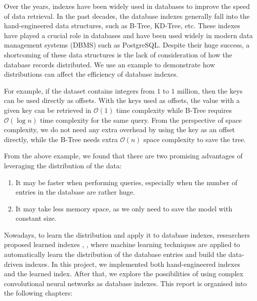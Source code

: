 Over the years, indexes have been widely used in databases to improve the speed of data retrieval. In the past decades, the database indexes generally fall into the hand-engineered data structures, such as B-Tree, KD-Tree, etc. These indexes have played a crucial role in databases and have been used widely in modern data management systems (DBMS) such as PostgreSQL. Despite their huge success, a shortcoming of these data structures is the lack of consideration of how the database records distributed. We use an example to demonstrate how distributions can affect the efficiency of database indexes.

\begin{mscexample}
	For example, if the dataset contains integers from $1$ to $1$ million, then the keys can be used directly as offsets. With the keys used as offsets, the value with a given key can be retrieved in $\mathcal{O}(1)$ time complexity while B-Tree requires $\mathcal{O}(\log n)$ time complexity for the same query. From the perspective of space complexity, we do not need any extra overhead by using the key as an offset directly, while the B-Tree needs extra $\mathcal{O}(n)$ space complexity to save the tree.
\end{mscexample}

From the above example, we found that there are two promising advantages of leveraging the distribution of the data:
\begin{enumerate}
  \item It may be faster when performing queries, especially when the number of entries in the database are rather huge.
  \item It may take less memory space, as we only need to save the model with constant size.
  \end{enumerate}

Nowadays, to learn the distribution and apply it to database indexes, researchers proposed learned indexes \cite{kraska2018case}, \cite{li2020lisa}, where machine learning techniques are applied to automatically learn the distribution of the database entries and build the data-driven indexes. In this project, we implemented both hand-engineered indexes and the learned index. After that, we explore the possibilities of using complex convolutional neural networks as database indexes. This report is organised into the following chapters:


